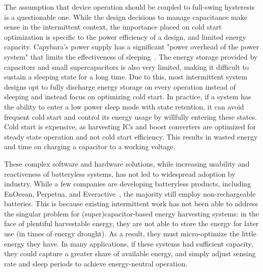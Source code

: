 The assumption that device operation should be coupled to full-swing hysteresis is a questionable one.
While the design decisions to manage capacitance make sense in the intermittent context, the importance placed on cold start optimization is specific to the power efficiency of a design, and limited energy capacity.
Capybara's power supply has a significant
"power overhead of the power system" that limits the effectiveness of
sleeping~\cite{colinReconfigurable18}. The energy storage provided by capacitors and small supercapacitors is also very limited, making it difficult to sustain a sleeping state for a long time.
Due to this, most intermittent system designs opt to fully discharge energy storage on every operation instead of sleeping and instead focus on optimizing cold start.
In practice, if a system has the ability to enter a low power sleep mode with state retention, it can avoid frequent cold start and control its energy usage by willfully entering these
states.
Cold start is expensive, as harvesting ICs and boost converters are optimized for steady state operation and not cold start efficiency. This results in wasted energy and time on charging a capacitor to a working voltage.

These complex software and hardware solutions, while increasing usability and reactiveness of batteryless systems, has not led to widespread adoption by industry.
While a few companies are developing batteryless products, including EnOcean, Perpetua, and Everactive~\cite{enocean, perpetua, everactive}, the majority still employ non-rechargeable batteries.
This is because existing intermittent work has not been able to address the singular problem for (super)capacitor-based energy
harvesting systems: in the face of plentiful harvestable energy, they are not
able to store the energy for later use (in times of energy drought).
As a result, they must
micro-optimize the little energy they have.
In many applications, if these
systems had sufficient capacity, they could capture a greater share of available energy, and simply adjust sensing rate and
sleep periods to achieve energy-neutral operation.



